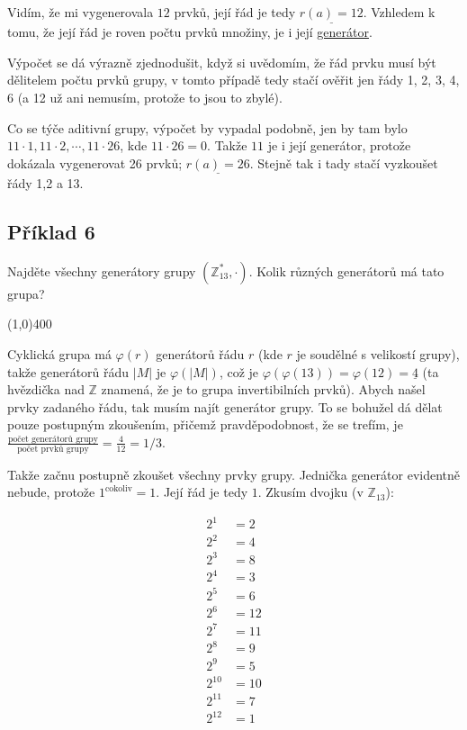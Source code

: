 \documentclass{article}
\begin{document}
Vidím, že mi vygenerovala $12$ prvků, její řád je tedy $\underline{r(a) = 12}$. Vzhledem k tomu, že její řád je roven počtu prvků množiny, je i její \underline{generátor}.

Výpočet se dá výrazně zjednodušit, když si uvědomím, že řád prvku musí být dělitelem počtu prvků grupy, v tomto případě tedy stačí ověřit jen řády 1, 2, 3, 4, 6 (a 12 už ani nemusím, protože to jsou to zbylé).
 
Co se týče aditivní grupy, výpočet by vypadal podobně, jen by tam bylo $11\cdot 1, 11\cdot 2, \cdots, 11\cdot 26$, kde $11\cdot 26 = 0$. Takže $11$ je i její generátor, protože dokázala vygenerovat 26 prvků; $\underline{r(a) = 26}$. Stejně tak i tady stačí vyzkoušet řády 1,2 a 13.

\subsection{\label{priklad1-6}Příklad 6}
Najděte všechny generátory grupy $(\mathbb{Z}_{13}^{*},\cdot)$. Kolik různých generátorů má tato grupa?

\line(1,0){400}

Cyklická grupa má $\varphi(r)$ generátorů řádu $r$ (kde $r$ je soudělné s velikostí grupy), takže generátorů řádu $|M|$ je $\varphi(|M|)$, což je $\varphi(\varphi(13)) = \varphi(12) = \underline{4}$ (ta hvězdička nad $\mathbb{Z}$ znamená, že je to grupa invertibilních prvků). Abych našel prvky zadaného řádu, tak musím najít generátor grupy. To se bohužel dá dělat pouze postupným zkoušením, přičemž pravděpodobnost, že se trefím, je $\frac{\mbox{počet generátorů grupy}}{\mbox{počet prvků grupy}} = \frac{4}{12} = 1/3$.

Takže začnu postupně zkoušet všechny prvky grupy. Jednička generátor evidentně nebude, protože $1^{\mbox{cokoliv}} = 1$. Její řád je tedy $1$. Zkusím dvojku (v $\mathbb{Z}_{13}$):

\begin{align*}
2^1 & = 2\\
2^2 & = 4\\
2^3 & = 8\\
2^4 & = 3\\
2^5 & = 6\\
2^6 & = 12\\
2^7 & = 11\\
2^8 & = 9\\
2^9 & = 5\\
2^{10} & = 10\\
2^{11} & = 7\\
2^{12} & = 1
\end{align*}
\end{document}
